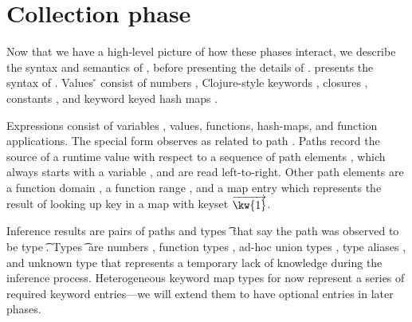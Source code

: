 \section{Collection phase}

Now that we have a high-level picture of how these phases interact,
we describe the syntax and semantics of \lambdatrack{}, before
presenting the details of \collectOp{}.
%
 presents the syntax of \lambdatrack{}.
Values \v{} consist of numbers \num{}, Clojure-style keywords {\kw{}},
closures {\closure{\uabs{\x{}}{\e{}}}{\openv{}}}, constants \const{},
and keyword keyed hash maps {\curlymapvaloverrightnoarrow{\kw{}}{\val{}}}.

Expressions \e{} consist of variables \x{}, values,
functions, hash-maps, and function applications.
The special form
\trackE{\e{}}{\inferpath{}}
observes {\e{}} as related to path {\inferpath{}}.
Paths \inferpath{} 
record the source of a runtime value with respect
to a sequence of path elements \pth{}, which always starts with
a variable \x{}, and are read left-to-right.
Other path elements are
a function domain \dompe{}, 
a function range \rngpe{},
and a map entry {}
which represents the result of looking up key {}
in a map with keyset ${\overrightarrow{\kw{1}}}$.

Inference results \restwoarrow{\inferpath{}}{\t{}}
are pairs of paths {\inferpath{}} and types \t{}
that say the path \inferpath{} was observed to be 
type \t{}.
Types \t{} are numbers \IntT{}, function types \arrow{\t{}}{\t{}},
ad-hoc union types \Union{\t{}}{\t{}},
type aliases \alias{},
and unknown type \UnknownT{} that represents
a temporary lack of knowledge during the inference process.
Heterogeneous keyword map types \HMappretty{\overrightarrow{\kw{}\ \t{}}}
for now represent a series of required keyword entries---we will extend
them to have optional entries in later phases.

